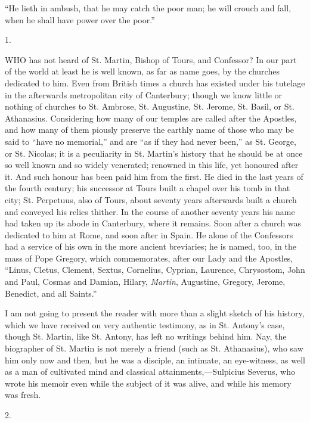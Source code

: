 
``He lieth in ambush, that he may catch the poor man; he
will crouch and fall, when he shall have power over the poor.''

1.

WHO has not heard of St. Martin, Bishop of
Tours, and Confessor? In our part of the world at least he is well
known, as far as name goes, by the churches dedicated to him. Even
from British times a church has existed under his tutelage in the
afterwards metropolitan city of Canterbury; though we know little or
nothing of churches to St. Ambrose, St. Augustine, St. Jerome, St.
Basil, or St. Athanasius. Considering how many of our temples are
called after the Apostles, and how many of them piously preserve the
earthly name of those who may be said to ``have no memorial,''
and are ``as if they had never been,'' as St. George, or St.
Nicolas; it is a peculiarity in St. Martin's history that he should be
at once so well known and so widely venerated; renowned in this life,
yet honoured after it. And such honour has been paid him from the
first. He died in the last years of the fourth century; his successor
at Tours built a chapel over his tomb in that city; St. Perpetuus,
also of Tours, about seventy years afterwards built a church and
conveyed his relics thither. In the course of another seventy
years his name had taken up its abode in Canterbury, where it remains.
Soon after a church was dedicated to him at Rome, and soon after in
Spain. He alone of the Confessors had a service of his own in the more
ancient breviaries; he is named, too, in the mass of Pope Gregory,
which commemorates, after our Lady and the Apostles, ``Linus,
Cletus, Clement, Sextus, Cornelius, Cyprian, Laurence, Chrysostom,
John and Paul, Cosmas and Damian, Hilary, \emph{Martin}, Augustine,
Gregory, Jerome, Benedict, and all Saints.''

I am not going to present the reader with more than a slight sketch
of his history, which we have received on very authentic testimony, as
in St. Antony's case, though St. Martin, like St. Antony, has left no
writings behind him. Nay, the biographer of St. Martin is not merely a
friend (such as St. Athanasius), who saw him only now and then, but he
was a disciple, an intimate, an eye-witness, as well as a man of
cultivated mind and classical attainments,—Sulpicius Severus, who
wrote his memoir even while the subject of it was alive, and while his
memory was fresh.

2.

